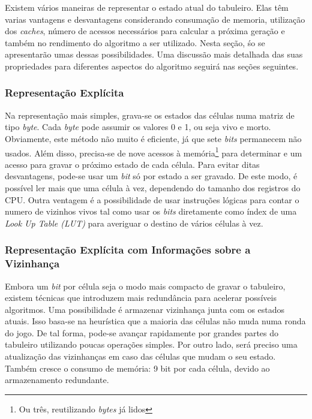 Existem vários maneiras de representar o estado atual do tabuleiro. Elas têm varias vantagens e desvantagens considerando consumação de memoria, utilização dos \textit{caches}, número de acessos necessários para calcular a próxima geração e também no rendimento do algoritmo a ser utilizado. Nesta seção, śo se apresentarão umas dessas possibilidades. Uma discussão mais detalhada das suas propriedades para diferentes aspectos do algoritmo seguirá nas seções seguintes.\\

\subsubsection{Representação Explícita}
Na representação mais simples, grava-se os estados das células numa matriz de tipo \textit{byte}. Cada \textit{byte} pode assumir os valores 0 e 1, ou seja vivo e morto. Obviamente, este método não muito é eficiente, já que sete \textit{bits} permanecem não usados. Além disso, precisa-se de nove acessos à memória\footnote{Ou três, reutilizando \textit{bytes} já lidos} para determinar e um acesso para gravar o próximo estado de cada célula. Para evitar ditas desvantagens, pode-se usar um \textit{bit} só por estado a ser gravado. De este modo, é possível ler mais que uma célula à vez, dependendo do tamanho dos registros do CPU. Outra ventagem é a possibilidade de usar instruções lógicas  para contar o numero de vizinhos vivos tal como usar os \textit{bits} diretamente como índex de uma \textit{Look Up Table (LUT)} para averiguar o destino de vários células à vez.\\

\subsubsection{Representação Explícita com Informações sobre a Vizinhança}
Embora um \textit{bit} por célula seja o modo mais compacto de gravar o tabuleiro, existem técnicas que introduzem mais redundância para acelerar possíveis algoritmos. Uma possibilidade é armazenar vizinhança junta com os estados atuais. Isso basa-se na heurística que a maioria das células não muda numa ronda do jogo. De tal forma, pode-se avançar rapidamente por grandes partes do tabuleiro utilizando poucas operações simples. Por outro lado, será preciso uma atualização das vizinhanças em caso das células que mudam o seu estado. Também cresce o consumo de memória: 9 bit por cada célula, devido ao armazenamento redundante.\\


